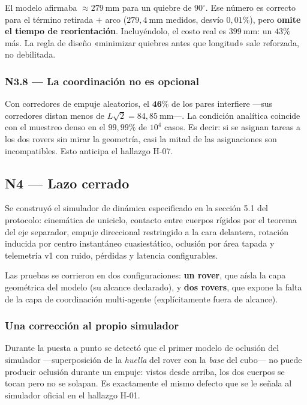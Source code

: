 \documentclass[11pt,a4paper]{article}
\newcommand{\grados}{^{\circ}}
\begin{document}
El modelo afirmaba $\approx279\ \mathrm{mm}$ para un quiebre de $90\grados$. Ese número
es correcto para el término retirada $+$ arco ($279{,}4\ \mathrm{mm}$ medidos, desvío
$0{,}01\%$), pero \textbf{omite el tiempo de reorientación}. Incluyéndolo, el costo real
es $399\ \mathrm{mm}$: un $43\%$ más. La regla de diseño «minimizar quiebres antes que
longitud» sale reforzada, no debilitada.

\subsubsection{N3.8 --- La coordinación no es opcional}

Con corredores de empuje aleatorios, el $\mathbf{46\%}$ de los pares interfiere ---sus
corredores distan menos de $L\sqrt2 = 84{,}85\ \mathrm{mm}$---. La condición analítica
coincide con el muestreo denso en el $99{,}99\%$ de $10^4$ casos. Es decir: si se asignan
tareas a los dos rovers sin mirar la geometría, casi la mitad de las asignaciones son
incompatibles. Esto anticipa el hallazgo H-07.

\subsection{N4 --- Lazo cerrado}

Se construyó el simulador de dinámica especificado en la sección 5.1 del protocolo:
cinemática de uniciclo, contacto entre cuerpos rígidos por el teorema del eje separador,
empuje direccional restringido a la cara delantera, rotación inducida por centro
instantáneo cuasiestático, oclusión por área tapada y telemetría v1 con ruido, pérdidas
y latencia configurables.

Las pruebas se corrieron en dos configuraciones: \textbf{un rover}, que aísla la capa
geométrica del modelo (su alcance declarado), y \textbf{dos rovers}, que expone la falta
de la capa de coordinación multi-agente (explícitamente fuera de alcance).

\subsubsection{Una corrección al propio simulador}

Durante la puesta a punto se detectó que el primer modelo de oclusión del simulador
---superposición de la \emph{huella} del rover con la \emph{base} del cubo--- no puede
producir oclusión durante un empuje: vistos desde arriba, los dos cuerpos se tocan pero
no se solapan. Es exactamente el mismo defecto que se le señala al simulador oficial en
el hallazgo H-01.
\end{document}
